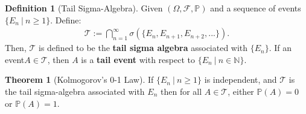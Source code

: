 \documentclass[11pt]{article}
\theoremstyle{definition}
\newtheorem{defn}{Definition}[section]
\theoremstyle{theorem}
\newtheorem{thm}{Theorem}[section]
\newcommand{\N}[0]{\mathbb{N}}
\newcommand{\prob}[1]{\mathbb{P}\left(#1 \right)}
\begin{document}
\begin{defn}[Tail Sigma-Algebra]
	Given \( (\Omega, \mathcal{F}, \mathbb{P}) \) and a sequence of events \( \{ E_n\ |\ n \geq 1 \} \). Define: 
	\begin{align}
		\mathcal{T} := \bigcap_{n=1}^\infty \sigma (\{ E_n, E_{n+1}, E_{n+2},... \}).
	\end{align}
	Then, \( \mathcal{T} \) is defined to be the \textbf{tail sigma algebra} associated with \( \{ E_n\} \). If an event\( A \in \mathcal{T} \), then \( A \) is a \textbf{tail event} with respect to \(\{ E_n\ |\ n \in \N \} \). 
\end{defn}

\begin{thm}[Kolmogorov's 0-1 Law]
	If \( \{ E_n\ |\ n \geq 1 \} \) is independent, and \( \mathcal{T} \) is the tail sigma-algebra associated with \( E_n \) then for all \( A \in \mathcal{T} \), either \( \prob{A} = 0 \) or \( \prob{A} = 1 \). 
\end{thm}
\end{document}
